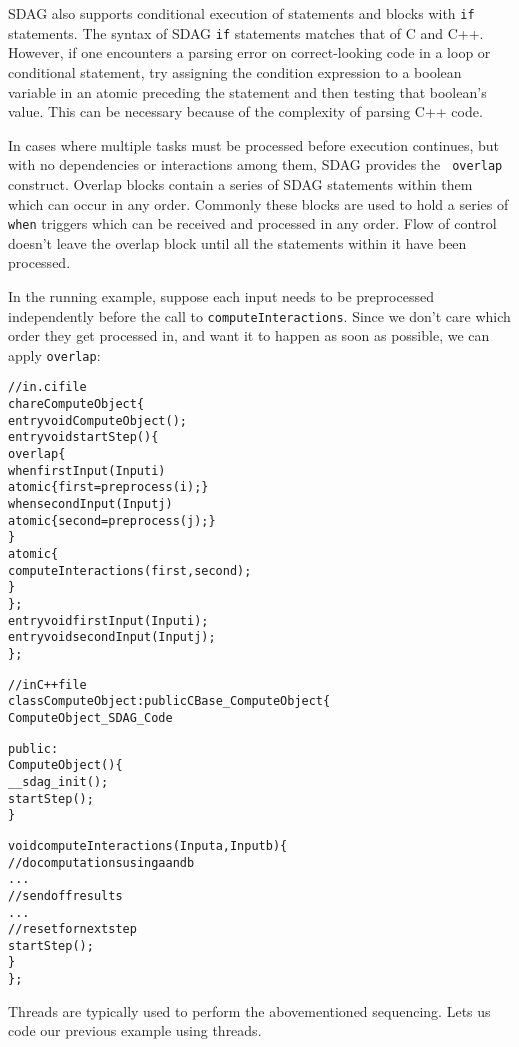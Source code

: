 SDAG also supports conditional execution of statements and blocks with {\tt if}
statements. The syntax of SDAG {\tt if} statements matches that of C and
C++. However, if one encounters a parsing error on correct-looking code in a
loop or conditional statement, try assigning the condition expression to a
boolean variable in an atomic preceding the statement and then testing that
boolean's value. This can be necessary because of the complexity of parsing C++
code.

In cases where multiple tasks must be processed before execution continues, but
with no dependencies or interactions among them, SDAG provides the {\tt
  overlap} construct. Overlap blocks contain a series of SDAG statements within
them which can occur in any order. Commonly these blocks are used to hold a
series of {\tt when} triggers which can be received and processed in any
order. Flow of control doesn't leave the overlap block until all the statements
within it have been processed.

In the running example, suppose each input needs to be preprocessed independently
before the call to {\tt computeInteractions}. Since we don't care which order
they get processed in, and want it to happen as soon as possible, we can apply
{\tt overlap}:
\begin{center}
\begin{alltt}
// in .ci file
chare ComputeObject \{
  entry void ComputeObject();
  entry void startStep() \{
    overlap \{
      when firstInput(Input i)
        atomic \{ first = preprocess(i); \}
      when secondInput(Input j)
        atomic \{ second = preprocess(j); \}
     \}
     atomic \{
       computeInteractions(first, second);
     \}
  \};
  entry void firstInput(Input i);
  entry void secondInput(Input j);
\};

// in C++ file
class ComputeObject : public CBase_ComputeObject \{
  ComputeObject_SDAG_Code

public:
  ComputeObject() \{
    __sdag_init();
    startStep();
  \}

  void computeInteractions(Input a, Input b) \{
    // do computations using a and b
    . . .
    // send off results
    . . .
    // reset for next step
    startStep();
  \}
\};
\end{alltt}
\end{center}



Threads are typically used to perform the abovementioned sequencing.
Lets us code our previous example using threads.

